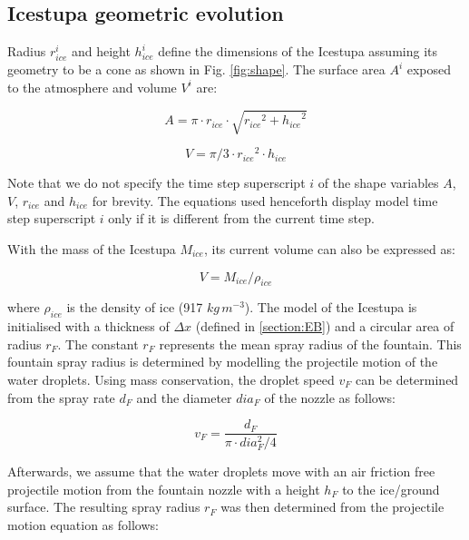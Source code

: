 \documentclass[utf8]{frontiersSCNS} %
\begin{document}
\subsection{Icestupa geometric evolution}

Radius $r_{ice}^i$ and height $h_{ice}^i$ define the dimensions of the Icestupa assuming its geometry to be a cone as
shown in Fig. \ref{fig:shape}. The surface area $A^i$ exposed to the atmosphere and volume $V^i$ are:

\begin{equation} A = \pi \cdot r_{ice} \cdot \sqrt{{r_{ice}}^2 + {h_{ice}}^ 2} \label{eqn:A} \end{equation}

\begin{equation} V = \pi/3 \cdot {r_{ice}}^2 \cdot h_{ice} \label{eqn:V} \end{equation}

Note that we do not specify the time step superscript $i$ of the shape variables $A$, $V$, $r_{ice}$ and $h_{ice}$ for
brevity.  The equations used henceforth display model time step superscript $i$ only if it is different from the
current time step.

With the mass of the Icestupa $M_{ice}$, its current volume can also be expressed as:

\begin{equation} V = M_{ice} / \rho_{ice} \label{eqn:V1} \end{equation}

where $\rho_{ice}$ is the density of ice (917 $kg\, m^{-3}$). The model of the Icestupa is initialised with a
thickness of $\Delta x$ (defined in \ref{section:EB}) and a circular area of radius $r_F$. The constant $r_F$
represents the mean spray radius of the fountain.  This fountain spray radius is determined by modelling the
projectile motion of the water droplets. Using mass conservation, the droplet speed $v_F$ can be determined from the
spray rate $d_F$ and the diameter $dia_F$ of the nozzle as follows:

\begin{equation} v_F = \frac{d_F}{\pi \cdot dia_F^2/4} \end{equation}

Afterwards, we assume that the water droplets move with an air friction free projectile motion from the fountain
nozzle with a height $h_F$ to the ice/ground surface. The resulting spray radius $r_F$ was then determined from the
projectile motion equation as follows:
\end{document}
